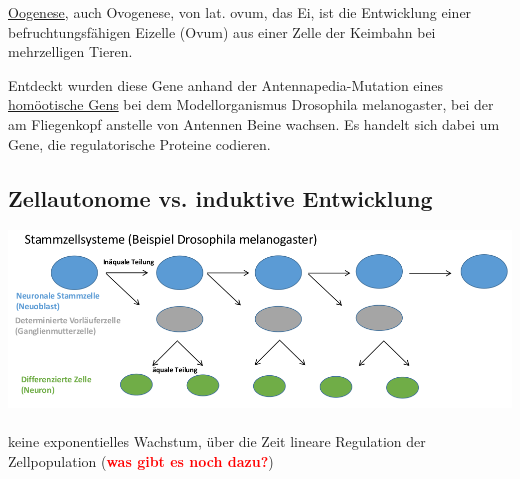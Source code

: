 \underline{Oogenese}, auch Ovogenese, von lat. ovum, das Ei, ist die Entwicklung einer befruchtungsfähigen Eizelle (Ovum) aus einer Zelle der Keimbahn bei mehrzelligen Tieren.

Entdeckt wurden diese Gene anhand der Antennapedia-Mutation eines \underline{homöotische Gens} bei dem Modellorganismus Drosophila melanogaster, bei der am Fliegenkopf anstelle von Antennen Beine wachsen. Es handelt sich dabei um Gene, die regulatorische Proteine codieren.

\subsection{Zellautonome vs. induktive Entwicklung}
\includegraphics[width=1\textwidth]{lectures/160420/pix/stammzellsystem.png}
\\\\
keine exponentielles Wachstum, über die Zeit lineare Regulation der Zellpopulation (\textcolor{red}{\textbf{was gibt es noch dazu?}}) 